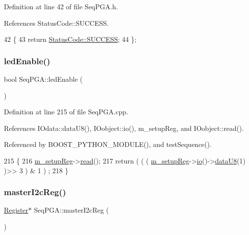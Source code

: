 Definition at line 42 of file Seq\+P\+G\+A.\+h.



References Status\+Code\+::\+S\+U\+C\+C\+E\+SS.


\begin{DoxyCode}
42                     \{
43     \textcolor{keywordflow}{return} \hyperlink{classStatusCode_a6f565cbeadc76d14c72f047e5e85eb4badd0da38d3ba0d922efd1f4619bc37ad8}{StatusCode::SUCCESS};
44   \};
\end{DoxyCode}
\mbox{\label{classSeqPGA_a45ec726e141bfef3fa59c4b2d36a0657}} 
\subsubsection{\texorpdfstring{led\+Enable()}{ledEnable()}}
{\footnotesize\ttfamily bool Seq\+P\+G\+A\+::led\+Enable (\begin{DoxyParamCaption}{ }\end{DoxyParamCaption})}



Definition at line 215 of file Seq\+P\+G\+A.\+cpp.



References I\+Odata\+::data\+U8(), I\+Oobject\+::io(), m\+\_\+setup\+Reg, and I\+Oobject\+::read().



Referenced by B\+O\+O\+S\+T\+\_\+\+P\+Y\+T\+H\+O\+N\+\_\+\+M\+O\+D\+U\+L\+E(), and test\+Sequence().


\begin{DoxyCode}
215                        \{
216   \hyperlink{classSeqPGA_a03269241e7fc26493cd0595beda334c2}{m\_setupReg}->\hyperlink{classIOobject_aa07610c11963b1db6710e3c76ceea456}{read}();
217   \textcolor{keywordflow}{return} ( ( ( \hyperlink{classSeqPGA_a03269241e7fc26493cd0595beda334c2}{m\_setupReg}->\hyperlink{classIOobject_af04fb94137c3d86849f478ac5afab5d1}{io}()->\hyperlink{classIOdata_a75e9c318dbac3a39402179070943d4bc}{dataU8}(1) )>> 3 ) & 1 ) ;
218 \}
\end{DoxyCode}
\mbox{\label{classSeqPGA_a3906fe0cdfd9042a67c0fa35ae75147a}} 
\subsubsection{\texorpdfstring{master\+I2c\+Reg()}{masterI2cReg()}}
{\footnotesize\ttfamily \hyperlink{classRegister}{Register}$\ast$ Seq\+P\+G\+A\+::master\+I2c\+Reg (\begin{DoxyParamCaption}{ }\end{DoxyParamCaption})\hspace{0.3cm}{\ttfamily [inline]}}



